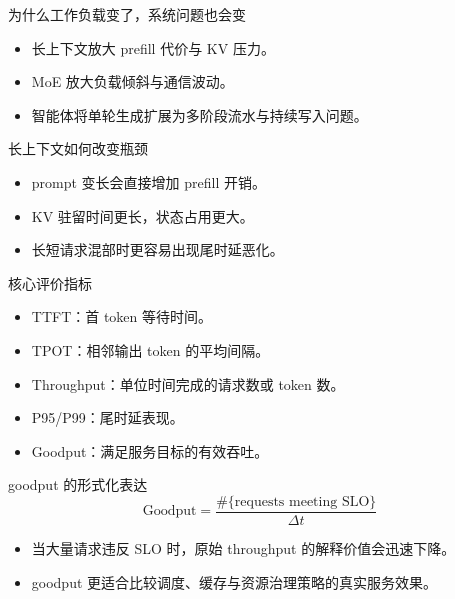 \begin{frame}{为什么工作负载变了，系统问题也会变}
  \begin{itemize}
    \item 长上下文放大 prefill 代价与 KV 压力。
    \item MoE 放大负载倾斜与通信波动。
    \item 智能体将单轮生成扩展为多阶段流水与持续写入问题。
  \end{itemize}
\end{frame}

\begin{frame}{长上下文如何改变瓶颈}
  \begin{itemize}
    \item prompt 变长会直接增加 prefill 开销。
    \item KV 驻留时间更长，状态占用更大。
    \item 长短请求混部时更容易出现尾时延恶化。
  \end{itemize}
\end{frame}

\begin{frame}{核心评价指标}
  \begin{itemize}
    \item TTFT：首 token 等待时间。
    \item TPOT：相邻输出 token 的平均间隔。
    \item Throughput：单位时间完成的请求数或 token 数。
    \item P95/P99：尾时延表现。
    \item Goodput：满足服务目标的有效吞吐。
  \end{itemize}
\end{frame}

\begin{frame}{goodput 的形式化表达}
  \[
    \text{Goodput} = \frac{\#\{\text{requests meeting SLO}\}}{\Delta t}
  \]
  \begin{itemize}
    \item 当大量请求违反 SLO 时，原始 throughput 的解释价值会迅速下降。
    \item goodput 更适合比较调度、缓存与资源治理策略的真实服务效果。
  \end{itemize}
\end{frame}

